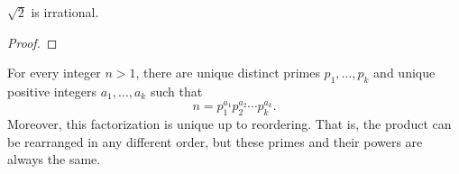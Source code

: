 \documentclass[11pt,a4paper]{article}
\begin{document}
\begin{prop}
    \(\sqrt{2}\) is irrational.
\end{prop}

\begin{proof}
    
\end{proof}


\begin{teo}
   For every integer $n>1$, there are unique distinct primes $p_1, \ldots, p_k $ and unique positive integers $a_1, \ldots, a_k $ such that
\[
n=p_1^{a_1} p_2^{a_2} \cdots p_k^{a_k}.
\] 
Moreover, this factorization is unique up to reordering. That is, the product  can be rearranged in any  different order, but these primes and their powers are always the same.
\end{teo}
\end{document}
